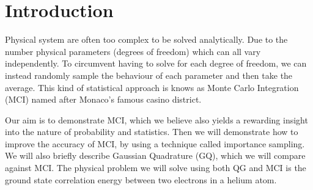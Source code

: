 \section{Introduction}

Physical system are often too complex to be solved analytically. Due to the
number physical parameters (degrees of freedom) which can all vary
independently. To circumvent having to solve for each degree of
freedom, we can instead randomly sample the behaviour of each parameter
and then take the average. This kind of statistical approach is knows as Monte Carlo
Integration (MCI) named after Monaco's famous casino district. 
  
Our aim is to demonstrate MCI, which we believe also yields
a rewarding insight into the nature of probability and statistics.  Then we
will demonstrate how to improve the accuracy of MCI, by
using a technique called importance sampling. We will also briefly describe
Gaussian Quadrature (GQ), which we will compare against MCI. The
physical problem we will solve using both QG and MCI is the ground state
correlation energy between two electrons in a helium atom. 